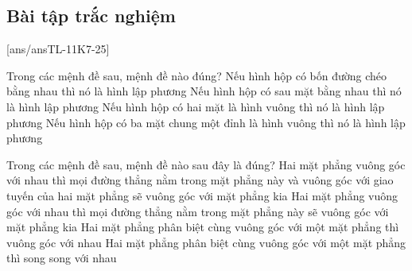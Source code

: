 \subsection{Bài tập trắc nghiệm}
[ans/ansTL-11K7-25]
\begin{ex}%
	Trong các mệnh đề sau, mệnh đề nào đúng?
	\choice
	{Nếu hình hộp có bốn đường chéo bằng nhau thì nó là hình lập phương}
	{Nếu hình hộp có sau mặt bằng nhau thì nó là hình lập phương}
	{Nếu hình hộp có hai mặt là hình vuông thì nó là hình lập phương}
	{\True Nếu hình hộp có ba mặt chung một đỉnh là hình vuông thì nó là hình lập phương}
\end{ex}
\begin{ex}%
	Trong các mệnh đề sau, mệnh đề nào sau đây là đúng?
	\choice
	{\True Hai mặt phẳng vuông góc với nhau thì mọi đường thẳng nằm trong mặt phẳng này và vuông góc với giao tuyến của hai mặt phẳng sẽ vuông góc với mặt phẳng kia}
	{Hai mặt phẳng vuông góc với nhau thì mọi đường thẳng nằm trong mặt phẳng này sẽ vuông góc với mặt phẳng kia}
	{Hai mặt phẳng phân biệt cùng vuông góc với một mặt phẳng thì vuông góc với nhau}
	{Hai mặt phẳng phân biệt cùng vuông góc với một mặt phẳng thì song song với nhau}
\end{ex}
